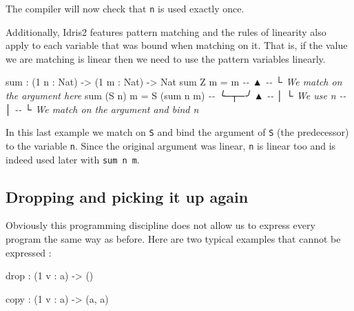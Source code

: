 \documentclass[
]{article}
\newenvironment{Shaded}{}{}
\newcommand{\CommentTok}[1]{\textcolor[rgb]{0.38,0.63,0.69}{\textit{#1}}}
\newcommand{\DataTypeTok}[1]{\textcolor[rgb]{0.56,0.13,0.00}{#1}}
\newcommand{\DecValTok}[1]{\textcolor[rgb]{0.25,0.63,0.44}{#1}}
\newcommand{\FunctionTok}[1]{\textcolor[rgb]{0.02,0.16,0.49}{#1}}
\newcommand{\NormalTok}[1]{#1}
\newcommand{\OperatorTok}[1]{\textcolor[rgb]{0.40,0.40,0.40}{#1}}
\newcommand{\OtherTok}[1]{\textcolor[rgb]{0.00,0.44,0.13}{#1}}
\begin{document}
The compiler will now check that \texttt{n} is used exactly once.

Additionally, Idris2 features pattern matching and the rules of
linearity also apply to each variable that was bound when matching on
it. That is, if the value we are matching is linear then we need to use
the pattern variables linearly.

\begin{Shaded}
\begin{Highlighting}[]
\FunctionTok{sum} \OperatorTok{:}\NormalTok{ (}\DecValTok{1}\NormalTok{ n }\OperatorTok{:} \DataTypeTok{Nat}\NormalTok{) }\OtherTok{{-}\textgreater{}}\NormalTok{ (}\DecValTok{1}\NormalTok{ m }\OperatorTok{:} \DataTypeTok{Nat}\NormalTok{) }\OtherTok{{-}\textgreater{}} \DataTypeTok{Nat}
\FunctionTok{sum} \DataTypeTok{Z}\NormalTok{ m }\OtherTok{=}\NormalTok{ m}
\CommentTok{{-}{-}  ▲}
\CommentTok{{-}{-}  └ We match on the argument here}
\FunctionTok{sum}\NormalTok{ (}\DataTypeTok{S}\NormalTok{ n) m }\OtherTok{=} \DataTypeTok{S}\NormalTok{ (}\FunctionTok{sum}\NormalTok{ n m)}
\CommentTok{{-}{-}  ╰─┬─╯            ▲}
\CommentTok{{-}{-}    │              └ We use \textasciigrave{}n\textasciigrave{}}
\CommentTok{{-}{-}    │}
\CommentTok{{-}{-}    └ We match on the argument and bind \textasciigrave{}n\textasciigrave{}}
\end{Highlighting}
\end{Shaded}

In this last example we match on \texttt{S} and bind the argument of
\texttt{S} (the predecessor) to the variable \texttt{n}. Since the
original argument was linear, \texttt{n} is linear too and is indeed
used later with \texttt{sum\ n\ m}.

\hypertarget{dropping-and-picking-it-up-again}{%
\subsection{Dropping and picking it up
again}\label{dropping-and-picking-it-up-again}}

Obviously this programming discipline does not allow us to express every
program the same way as before. Here are two typical examples that
cannot be expressed :

\begin{Shaded}
\begin{Highlighting}[]
\FunctionTok{drop} \OperatorTok{:}\NormalTok{ (}\DecValTok{1}\NormalTok{ v }\OperatorTok{:}\NormalTok{ a) }\OtherTok{{-}\textgreater{}}\NormalTok{ ()}

\NormalTok{copy }\OperatorTok{:}\NormalTok{ (}\DecValTok{1}\NormalTok{ v }\OperatorTok{:}\NormalTok{ a) }\OtherTok{{-}\textgreater{}}\NormalTok{ (a, a)}
\end{Highlighting}
\end{Shaded}
\end{document}
